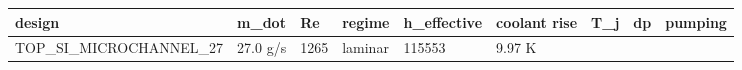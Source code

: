 \documentclass[10pt,]{article}
\begin{document}
\begin{longtable}[]{@{}lllllllll@{}}
\toprule
\begin{minipage}[b]{0.08\columnwidth}\raggedright
design\strut
\end{minipage} & \begin{minipage}[b]{0.08\columnwidth}\raggedright
m\_dot\strut
\end{minipage} & \begin{minipage}[b]{0.08\columnwidth}\raggedright
Re\strut
\end{minipage} & \begin{minipage}[b]{0.08\columnwidth}\raggedright
regime\strut
\end{minipage} & \begin{minipage}[b]{0.08\columnwidth}\raggedright
h\_effective\strut
\end{minipage} & \begin{minipage}[b]{0.08\columnwidth}\raggedright
coolant rise\strut
\end{minipage} & \begin{minipage}[b]{0.08\columnwidth}\raggedright
T\_j\strut
\end{minipage} & \begin{minipage}[b]{0.08\columnwidth}\raggedright
dp\strut
\end{minipage} & \begin{minipage}[b]{0.08\columnwidth}\raggedright
pumping\strut
\end{minipage}\tabularnewline
\midrule
\endhead
\begin{minipage}[t]{0.08\columnwidth}\raggedright
TOP\_SI\_MICROCHANNEL\_27\strut
\end{minipage} & \begin{minipage}[t]{0.08\columnwidth}\raggedright
27.0 g/s\strut
\end{minipage} & \begin{minipage}[t]{0.08\columnwidth}\raggedright
1265\strut
\end{minipage} & \begin{minipage}[t]{0.08\columnwidth}\raggedright
laminar\strut
\end{minipage} & \begin{minipage}[t]{0.08\columnwidth}\raggedright
115553\strut
\end{minipage} & \begin{minipage}[t]{0.08\columnwidth}\raggedright
9.97 K\strut
\end{minipage} & \begin{minipage}[t]{0.08\columnwidth}\raggedright

\end{minipage}
\end{longtable}
\end{document}
